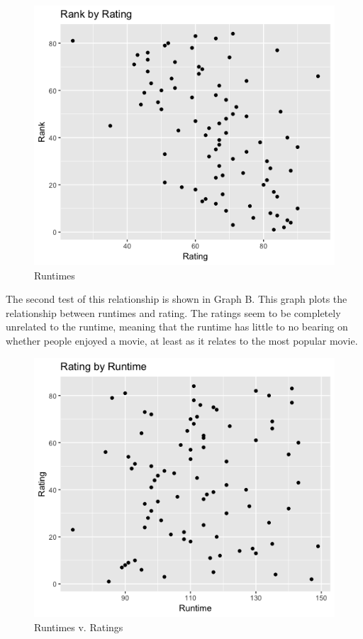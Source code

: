 \documentclass{article}
\begin{document}
\begin{figure}[h!]
\centering
\includegraphics[scale=.5]{PS6a_Holt}
\caption{Runtimes}
\label{fig:PS6a_Holt}
\end{figure}

The second test of this relationship is shown in Graph B. This graph plots the relationship between runtimes and rating. The ratings seem to be completely unrelated to the runtime, meaning that the runtime has little to no bearing on whether people enjoyed a movie, at least as it relates to the most popular movie.

\begin{figure}[h!]
\centering
\includegraphics[scale=.5]{PS6b_Holt}
\caption{Runtimes v. Ratings}
\label{fig:PS6b_Holt}
\end{figure}
\end{document}
